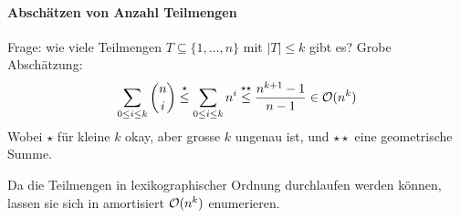 \paragraph{Abschätzen von Anzahl Teilmengen}
Frage: wie viele Teilmengen $T \subseteq \{1, \dots, n\}$ mit $|T| \leq k$ gibt es?
Grobe Abschätzung:
$$ \sum_{0 \leq i \leq k} \binom{n}{i}
\overset{\star}{\leq} \sum_{0 \leq i \leq k} n^i
\overset{\star\star}{\leq} \frac{n^{k+1} - 1}{n-1} \in \mathcal{O}(n^k) $$
Wobei $\star$ für kleine $k$ okay, aber grosse $k$ ungenau ist, und $\star\star$ eine geometrische Summe.

Da die Teilmengen in lexikographischer Ordnung durchlaufen werden können, lassen sie sich in amortisiert
$\mathcal{O}(n^k)$ enumerieren.

